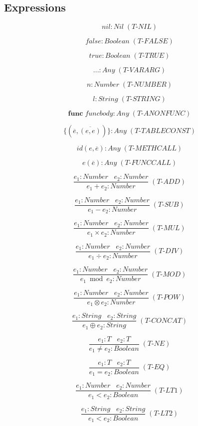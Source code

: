 \documentclass[12pt]{article}
\begin{document}
\subsection{Expressions}

\[
nil : Nil \; (\textit{T-NIL})
\]

\[
false : Boolean \; (\textit{T-FALSE})
\]

\[
true : Boolean \; (\textit{T-TRUE})
\]

\[
{...} : Any \; (\textit{T-VARARG})
\]

\[
n : Number \; (\textit{T-NUMBER})
\]

\[
l : String \; (\textit{T-STRING})
\]

\[
\textbf{func} \; funcbody : Any \; (\textit{T-ANONFUNC})
\]

\[
\{(\overline{e},\overline{(e,e)})\} : Any \; (\textit{T-TABLECONST})
\]

\[
id(e,\overline{e}) : Any \; (\textit{T-METHCALL})
\]

\[
e(\overline{e}) : Any \; (\textit{T-FUNCCALL})
\]

\[
\frac{e_{1}:Number \;\;\; e_{2}:Number}
     {e_{1} + e_{2} : Number} \; (\textit{T-ADD})
\]

\[
\frac{e_{1}:Number \;\;\; e_{2}:Number}
     {e_{1} - e_{2} : Number} \; (\textit{T-SUB})
\]

\[
\frac{e_{1}:Number \;\;\; e_{2}:Number}
     {e_{1} \times e_{2} : Number} \; (\textit{T-MUL})
\]

\[
\frac{e_{1}:Number \;\;\; e_{2}:Number}
     {e_{1} \div e_{2} : Number} \; (\textit{T-DIV})
\]

\[
\frac{e_{1}:Number \;\;\; e_{2}:Number}
     {e_{1} \bmod e_{2} : Number} \; (\textit{T-MOD})
\]

\[
\frac{e_{1}:Number \;\;\; e_{2}:Number}
     {e_{1} \otimes e_{2} : Number} \; (\textit{T-POW})
\]

\[
\frac{e_{1}:String \;\;\; e_{2}:String}
     {e_{1} \oplus e_{2} : String} \; (\textit{T-CONCAT})
\]

\[
\frac{e_{1}:T \;\;\; e_{2}:T}
     {e_{1} \not= e_{2} : Boolean} \; (\textit{T-NE})
\]

\[
\frac{e_{1}:T \;\;\; e_{2}:T}
     {e_{1} = e_{2} : Boolean} \; (\textit{T-EQ})
\]

\[
\frac{e_{1}:Number \;\;\; e_{2}:Number}
     {e_{1} < e_{2} : Boolean} \; (\textit{T-LT1})
\]

\[
\frac{e_{1}:String \;\;\; e_{2}:String}
     {e_{1} < e_{2} : Boolean} \; (\textit{T-LT2})
\]
\end{document}

